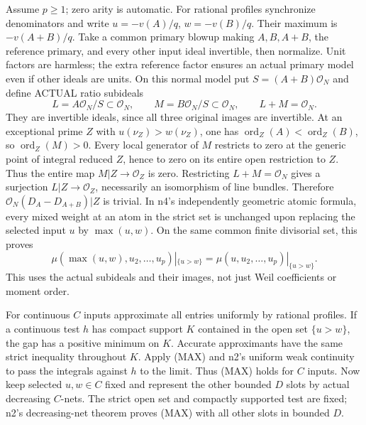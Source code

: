 \documentclass[11pt]{article}
\begin{document}
Assume \(p\ge1\); zero arity is automatic. For rational profiles synchronize denominators and write \(u=-v(A)/q\), \(w=-v(B)/q\). Their maximum is \(-v(A+B)/q\). Take a common primary blowup making \(A,B,A+B\), the reference primary, and every other input ideal invertible, then normalize. Unit factors are harmless; the extra reference factor ensures an actual primary model even if other ideals are units. On this normal model put \(S=(A+B)\mathcal O_N\) and define ACTUAL ratio subideals
\[
L=A\mathcal O_N/S\subset\mathcal O_N,\qquad
M=B\mathcal O_N/S\subset\mathcal O_N,\qquad L+M=\mathcal O_N.
\]
They are invertible ideals, since all three original images are invertible. At an exceptional prime \(Z\) with \(u(\nu_Z)>w(\nu_Z)\), one has \(\operatorname{ord}_Z(A)<\operatorname{ord}_Z(B)\), so \(\operatorname{ord}_Z(M)>0\). Every local generator of \(M\) restricts to zero at the generic point of integral reduced \(Z\), hence to zero on its entire open restriction to \(Z\). Thus the entire map \(M|Z\to\mathcal O_Z\) is zero. Restricting \(L+M=\mathcal O_N\) gives a surjection \(L|Z\to\mathcal O_Z\), necessarily an isomorphism of line bundles. Therefore
\(\mathcal O_N(D_A-D_{A+B})|Z\) is trivial. In n4's independently geometric atomic formula, every mixed weight at an atom in the strict set is unchanged upon replacing the selected input \(u\) by \(\max(u,w)\). On the same common finite divisorial set, this proves
\[
\mu(\max(u,w),u_2,\ldots,u_p)|_{\{u>w\}}
=\mu(u,u_2,\ldots,u_p)|_{\{u>w\}}. \tag{MAX}
\]
This uses the actual subideals and their images, not just Weil coefficients or moment order.

For continuous \(C\) inputs approximate all entries uniformly by rational profiles. If a continuous test \(h\) has compact support \(K\) contained in the open set \(\{u>w\}\), the gap has a positive minimum on \(K\). Accurate approximants have the same strict inequality throughout \(K\). Apply (MAX) and n2's uniform weak continuity to pass the integrals against \(h\) to the limit. Thus (MAX) holds for \(C\) inputs. Now keep selected \(u,w\in C\) fixed and represent the other bounded \(D\) slots by actual decreasing \(C\)-nets. The strict open set and compactly supported test are fixed; n2's decreasing-net theorem proves (MAX) with all other slots in bounded \(D\).
\end{document}
